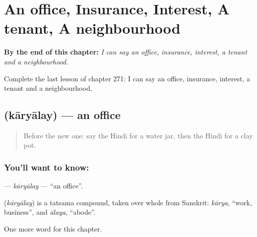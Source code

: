 
\chapter{An office, Insurance, Interest, A tenant, A neighbourhood}
\label{ch:hi-an-office-insurance-interest-a-tenant-a-neighbourhood}

\begin{chapteropening}
\textbf{By the end of this chapter:} \emph{I can say an office, insurance, interest, a tenant and a neighbourhood.}

Complete the last lesson of chapter 271: I can say an office, insurance, interest, a tenant and a neighbourhood.
\end{chapteropening}

\section[\texorpdfstring{\hi{कार्यालय} (kāryālay)}{कार्यालय (kāryālay)}]{ (kāryālay) — an office}

\label{lesson:HI-C271-karyalay}



\begin{quote}
Before the new one: say the Hindi for a water jar, then the Hindi for a clay pot.
\end{quote}

\subsection*{You'll want to know: }
\textbf{} — \emph{kāryālay} — \textquotedblleft{}an office\textquotedblright{}.

\begin{cousinweb}
\textbf{} (\emph{kāryālay}) is a tatsama compound, taken over whole from Sanskrit: \emph{kārya}, \textquotedblleft{}work, business\textquotedblright{}, and \emph{ālaya}, \textquotedblleft{}abode\textquotedblright{}.
\end{cousinweb}

\begin{grammarlens}[title={What you've built}]
One more word for this chapter.
\end{grammarlens}

